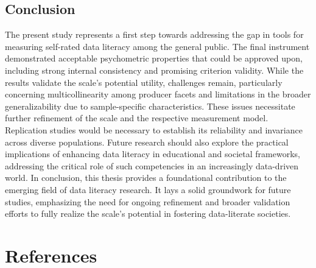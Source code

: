 \documentclass[
  12pt,
  a4paper,
  twoside]{article}
\begin{document}
\subsection{Conclusion}\label{conclusion}

The present study represents a first step towards addressing the gap in tools for measuring self-rated data literacy among the general public.
The final instrument demonstrated acceptable psychometric properties that could be approved upon, including strong internal consistency and promising criterion validity.
While the results validate the scale's potential utility, challenges remain, particularly concerning multicollinearity among producer facets and limitations in the broader generalizability due to sample-specific characteristics. These issues necessitate further refinement of the scale and the respective measurement model. Replication studies would be necessary to establish its reliability and invariance across diverse populations. Future research should also explore the practical implications of enhancing data literacy in educational and societal frameworks, addressing the critical role of such competencies in an increasingly data-driven world.
In conclusion, this thesis provides a foundational contribution to the emerging field of data literacy research. It lays a solid groundwork for future studies, emphasizing the need for ongoing refinement and broader validation efforts to fully realize the scale's potential in fostering data-literate societies.

\section*{References}\label{references}
\end{document}
